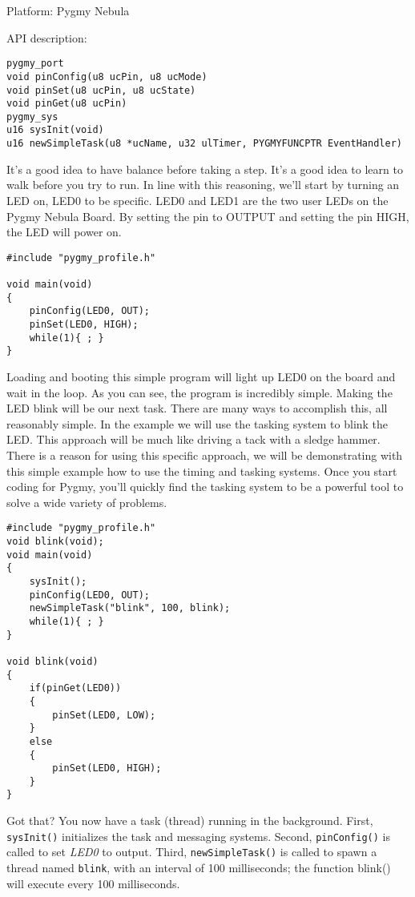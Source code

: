 \documentclass{article}
\begin{document}
Platform: Pygmy Nebula

API description:

\begin{lstlisting}
pygmy_port
void pinConfig(u8 ucPin, u8 ucMode)
void pinSet(u8 ucPin, u8 ucState)
void pinGet(u8 ucPin)
pygmy_sys
u16 sysInit(void)
u16 newSimpleTask(u8 *ucName, u32 ulTimer, PYGMYFUNCPTR EventHandler)
\end{lstlisting}

It's a good idea to have balance before taking a step. It's a good idea to learn to walk before you try to run. In line with this reasoning, we'll start by turning an LED on, LED0 to be specific. LED0 and LED1 are the two user LEDs on the Pygmy Nebula Board. By setting the pin to OUTPUT and setting the pin HIGH, the LED will power on.

\begin{lstlisting}
#include "pygmy_profile.h"

void main(void)
{
	pinConfig(LED0, OUT);
	pinSet(LED0, HIGH);
	while(1){ ; }
}
\end{lstlisting}

Loading and booting this simple program will light up LED0 on the board and wait in the loop. As you can see, the program is incredibly simple. Making the LED blink will be our next task. There are many ways to accomplish this, all reasonably simple. In the example we will use the tasking system to blink the LED. This approach will be much like driving a tack with a sledge hammer. There is a reason for using this specific approach, we will be demonstrating with this simple example how to use the timing and tasking systems. Once you start coding for Pygmy, you'll quickly find the tasking system to be a powerful tool to solve a wide variety of problems.

\begin{lstlisting}
#include "pygmy_profile.h"
void blink(void);
void main(void)
{
	sysInit();
	pinConfig(LED0, OUT);
	newSimpleTask("blink", 100, blink);
	while(1){ ; }
}

void blink(void)
{
	if(pinGet(LED0))
	{
		pinSet(LED0, LOW);
	}
	else
	{
		pinSet(LED0, HIGH);
	}
}
\end{lstlisting}

Got that? You now have a task (thread) running in the background. First, \verb|sysInit()| initializes the task and messaging systems. Second, \verb|pinConfig()| is called to set \emph{LED0} to output. Third, \verb|newSimpleTask()| is called to spawn a thread named \verb|blink|, with an interval of 100 milliseconds; the function blink() will execute every 100 milliseconds.
\end{document}
